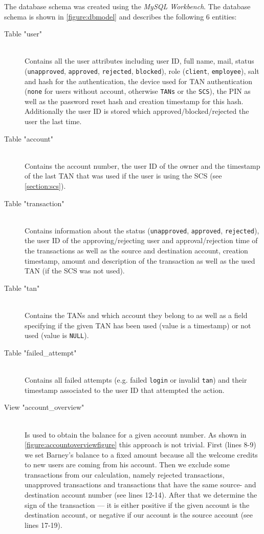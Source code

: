 \clearpage

The database schema was created using the \emph{MySQL Workbench}. The database schema is shown in \autoref{figure:dbmodel} and describes the following 6 entities:
\begin{description}
	\item[Table "user"] \hfill \\
	Contains all the user attributes including user ID, full name, mail, status (\texttt{unapproved}, \texttt{approved}, \texttt{rejected}, \texttt{blocked}), role (\texttt{client}, \texttt{employee}), salt and hash for the authentication, the device used for TAN authentication (\texttt{none} for users without account, otherwise \texttt{TANs} or the \texttt{SCS}), the PIN as well as the password reset hash and creation timestamp for this hash. Additionally the user ID is stored which approved/blocked/rejected the user the last time.
	
	\item[Table "account"] \hfill \\
	Contains the account number, the user ID of the owner and the timestamp of the last TAN that was used if the user is using the SCS (see \autoref{section:scs}).
	
	\item[Table "transaction"] \hfill \\
	Contains information about the status (\texttt{unapproved}, \texttt{approved}, \texttt{rejected}), the user ID of the approving/rejecting user and approval/rejection time of the transactions as well as the source and destination account, creation timestamp, amount and description of the transaction as well as the used TAN (if the SCS was not used).
	
	\item[Table "tan"] \hfill \\
	Contains the TANs and which account they belong to as well as a field specifying if the given TAN has been used (value is a timestamp) or not used (value is \texttt{NULL}).
	
	\item[Table "failed\_attempt"] \hfill \\
	Contains all failed attempts (e.g. failed \texttt{login} or invalid \texttt{tan}) and their timestamp associated to the user ID that attempted the action.
	
	\item[View "account\_overview"] \hfill \\
	Is used to obtain the balance for a given account number. As shown in \autoref{figure:accountoverviewfigure} this approach is not trivial. First (lines 8-9) we set Barney's balance to a fixed amount because all the welcome credits to new users are coming from his account. Then we exclude some transactions from our calculation, namely rejected transactions, unapproved transactions and transactions that have the same source- and destination account number (see lines 12-14). After that we determine the sign of the transaction --- it is either positive if the given account is the destination account, or negative if our account is the source account (see lines 17-19).
	

\end{description}
